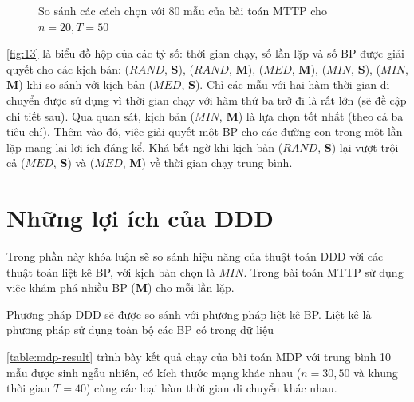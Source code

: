 \documentclass[../main.tex]{subfiles}
\begin{document}
\begin{figure}
  \caption{So sánh các cách chọn với 80 mẫu của bài toán MTTP cho \(n=20, T=50\)}
  \label{fig:13}
\end{figure}

\autoref{fig:13} là biểu đồ hộp của các tỷ số: thời gian chạy, số lần lặp và số
BP được giải quyết cho các kịch bản: (\(RAND\), \textbf{S}), (\(RAND\),
\textbf{M}), (\(MED\), \textbf{M}), (\(MIN\), \textbf{S}), (\(MIN\),
\textbf{M}) khi so sánh với kịch bản (\(MED\), \textbf{S}). Chỉ các mẫu
với hai hàm thời gian di chuyển được sử dụng vì thời gian chạy với hàm
thứ ba trở đi là rất lớn (sẽ đề cập chi tiết sau). Qua quan sát, kịch
bản (\(MIN\), \textbf{M}) là lựa chọn tốt nhất (theo cả ba tiêu chí).
Thêm vào đó, việc giải quyết một BP cho các đường con trong một lần lặp
mang lại lợi ích đáng kể. Khá bất ngờ khi kịch bản (\(RAND\),
\textbf{S}) lại vượt trội cả (\(MED\), \textbf{S}) và (\(MED\),
\textbf{M}) về thời gian chạy trung bình.

\section{Những lợi ích của
DDD}\label{nhux1eefng-lux1ee3i-uxedch-cux1ee7a-ddd}

Trong phần này khóa luận sẽ so sánh hiệu năng của thuật toán DDD với các thuật
toán liệt kê BP, với kịch bản chọn là \(MIN\). Trong bài toán MTTP sử
dụng việc khám phá nhiều BP (\textbf{M}) cho mỗi lần lặp.

Phương pháp DDD sẽ được so sánh với phương pháp liệt kê BP. Liệt kê là phương pháp sử dụng 
toàn bộ các BP có trong dữ liệu 

\autoref{table:mdp-result} trình bày kết quả chạy của bài toán MDP với trung bình 10 mẫu được sinh ngẫu
nhiên, có kích thước mạng khác nhau (\(n=30,50\) và khung thời gian
\(T=40\)) cùng các loại hàm thời gian di chuyển khác nhau.

\end{document}
